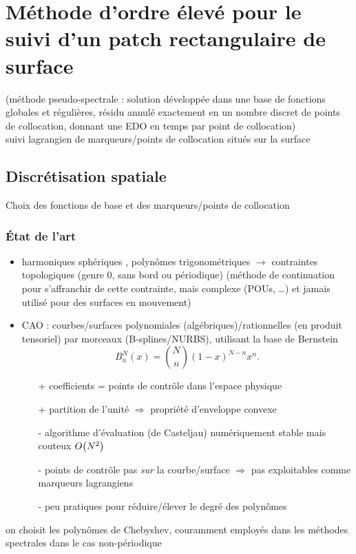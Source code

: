 \chapter{Méthode d'ordre élevé pour le suivi d'un patch rectangulaire de surface}

(méthode pseudo-spectrale : solution développée dans une base de fonctions globales et régulières, résidu annulé exactement en un nombre discret de points de collocation, donnant une EDO en temps par point de collocation)\\

suivi lagrangien de marqueurs/points de collocation situés sur la surface\\

\section{Discrétisation spatiale}

Choix des fonctions de base et des marqueurs/points de collocation\\
\subsection{État de l'art}
\begin{itemize}
	\item harmoniques sphériques \cite{veerapaneni2011}, polynômes trigonométriques \cite{gueyffier2015} $\to$ contraintes topologiques (genre 0, sans bord ou périodique) (méthode de continuation \cite{bruno2007} pour s'affranchir de cette contrainte, mais complexe (POUs, \ldots) et jamais utilisé pour des surfaces en mouvement)
	\item CAO : courbes/surfaces polynomiales (algébriques)/rationnelles (en produit tensoriel) par morceaux (B-splines/NURBS), utilisant la base de Bernstein
	\begin{equation}
		B_n^N(x) = \binom{N}{n} \left( 1 - x \right)^{N-n} x^n.
	\end{equation}
	\begin{itemize}
		\item[+] coefficients = points de contrôle dans l'espace physique
		\item[+] partition de l'unité $\Rightarrow$ propriété d'enveloppe convexe
		\item[-] algorithme d'évaluation (de Casteljau) numériquement stable mais couteux $O\!\left( {N^2} \right)$
		\item[-] points de contrôle pas \emph{sur} la courbe/surface $\Rightarrow$ pas exploitables comme marqueurs lagrangiens
		\item[-] peu pratiques pour réduire/élever le degré des polynômes
	\end{itemize}
\end{itemize}
\bigskip
on choisit les polynômes de Chebyshev, couramment employés dans les méthodes spectrales dans le cas non-périodique
